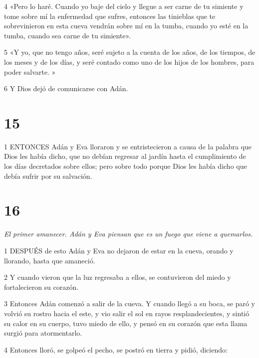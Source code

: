 \par 4 «Pero lo haré. Cuando yo baje del cielo y llegue a ser carne de tu simiente y tome sobre mí la enfermedad que sufres, entonces las tinieblas que te sobrevinieron en esta cueva vendrán sobre mí en la tumba, cuando yo esté en la tumba, cuando sea carne de tu simiente».

\par 5 «Y yo, que no tengo años, seré sujeto a la cuenta de los años, de los tiempos, de los meses y de los días, y seré contado como uno de los hijos de los hombres, para poder salvarte. »

\par 6 Y Dios dejó de comunicarse con Adán.

\chapter{15}

\par 1 ENTONCES Adán y Eva lloraron y se entristecieron a causa de la palabra que Dios les había dicho, que no debían regresar al jardín hasta el cumplimiento de los días decretados sobre ellos; pero sobre todo porque Dios les había dicho que debía sufrir por su salvación.

\chapter{16}

\par \textit{El primer amanecer. Adán y Eva piensan que es un fuego que viene a quemarlos.}

\par 1 DESPUÉS de esto Adán y Eva no dejaron de estar en la cueva, orando y llorando, hasta que amaneció.

\par 2 Y cuando vieron que la luz regresaba a ellos, se contuvieron del miedo y fortalecieron su corazón.

\par 3 Entonces Adán comenzó a salir de la cueva. Y cuando llegó a su boca, se paró y volvió su rostro hacia el este, y vio salir el sol en rayos resplandecientes, y sintió su calor en su cuerpo, tuvo miedo de ello, y pensó en su corazón que esta llama surgió para atormentarlo.

\par 4 Entonces lloró, se golpeó el pecho, se postró en tierra y pidió, diciendo:

